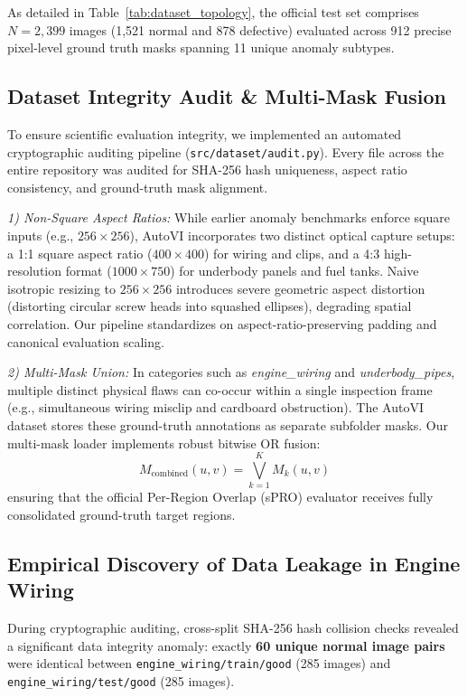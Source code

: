 \documentclass[journal,twocolumn]{IEEEtran}
\begin{document}
As detailed in Table~\ref{tab:dataset_topology}, the official test set comprises $N = 2,399$ images (1,521 normal and 878 defective) evaluated across 912 precise pixel-level ground truth masks spanning 11 unique anomaly subtypes.

\subsection{Dataset Integrity Audit \& Multi-Mask Fusion}
To ensure scientific evaluation integrity, we implemented an automated cryptographic auditing pipeline (\texttt{src/dataset/audit.py}). Every file across the entire repository was audited for SHA-256 hash uniqueness, aspect ratio consistency, and ground-truth mask alignment.

\textit{1) Non-Square Aspect Ratios:} While earlier anomaly benchmarks enforce square inputs (e.g., $256 \times 256$), AutoVI incorporates two distinct optical capture setups: a 1:1 square aspect ratio ($400 \times 400$) for wiring and clips, and a 4:3 high-resolution format ($1000 \times 750$) for underbody panels and fuel tanks. Naive isotropic resizing to $256 \times 256$ introduces severe geometric aspect distortion (distorting circular screw heads into squashed ellipses), degrading spatial correlation. Our pipeline standardizes on aspect-ratio-preserving padding and canonical evaluation scaling.

\textit{2) Multi-Mask Union:} In categories such as \textit{engine\_wiring} and \textit{underbody\_pipes}, multiple distinct physical flaws can co-occur within a single inspection frame (e.g., simultaneous wiring misclip and cardboard obstruction). The AutoVI dataset stores these ground-truth annotations as separate subfolder masks. Our multi-mask loader implements robust bitwise OR fusion:
\begin{equation}
M_{\text{combined}}(u, v) = \bigvee_{k=1}^K M_k(u, v)
\end{equation}
ensuring that the official Per-Region Overlap (sPRO) evaluator receives fully consolidated ground-truth target regions.

\subsection{Empirical Discovery of Data Leakage in Engine Wiring}
During cryptographic auditing, cross-split SHA-256 hash collision checks revealed a significant data integrity anomaly: exactly \textbf{60 unique normal image pairs} were identical between \texttt{engine\_wiring/train/good} (285 images) and \texttt{engine\_wiring/test/good} (285 images).
\end{document}
